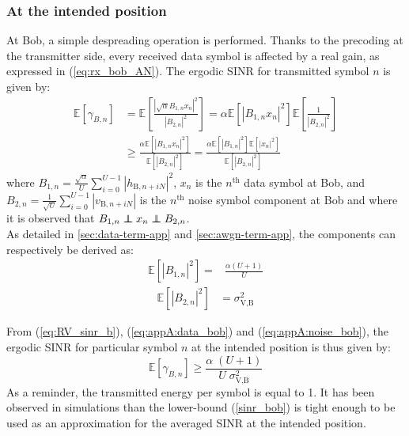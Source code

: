 \documentclass[journal,comsoc]{IEEEtran}
\newcommand{\EX}[1]{\mathbb{E} \left[#1\right]}%
\newcommand\independent{\protect\mathpalette{\protect\independenT}{\perp}}
\def\independenT#1#2{\mathrel{\rlap{$#1#2$}\mkern2mu{#1#2}}}
\begin{document}
\subsubsection{At the intended position}
At Bob, a simple despreading operation is performed. Thanks to the precoding at the transmitter side, every received data symbol is affected by a real gain, as expressed in (\ref{eq:rx_bob_AN}). The ergodic SINR for transmitted symbol $n$ is given by:
\begin{equation}
\begin{split}
\EX{\gamma_{B,n}} &= \EX{ \frac{  \left| \sqrt{\alpha} B_{1,n} x_n \right|^2  }{  \left| B_{2,n} \right|^2} }  = \alpha \EX{\left| B_{1,n}  x_n\right|^2}  \EX{\frac{1}{\left| B_{2,n} \right|^2}}  \\
& \geq  \frac{\alpha \EX{  \left| B_{1,n}  x_n\right|^2 } }{\EX{ \left| B_{2,n} \right|^2 }} =  \frac{\alpha \EX{ \left|B_{1,n}  \right|^2 } \EX{ \left| x_n \right|^2 } }{\EX{ \left| B_{2,n} \right|^2 }}
\label{eq:RV_sinr_b}
\end{split}
\end{equation}
where $B_{1,n} = \frac{\sqrt{\alpha}}{U}\sum_{i=0}^{U-1} \left| h_{\text{B}, n + iN}\right|^2$, $x_n$ is the $n^{\text{th}}$ data symbol at Bob, and $B_{2,n} = \frac{1}{\sqrt{U}}\sum_{i=0}^{U-1} \left| v_{\text{B}, n + iN}\right|$ is the $n^{\text{th}}$ noise symbol component at Bob and where it is observed that $B_{1,n} \independent x_n \independent B_{2,n}$.\\
As detailed in \ref{sec:data-term-app} and \ref{sec:awgn-term-app}, the components can respectively be derived as:
\begin{equation}
	\begin{split}
	\EX{|B_{1,n}|^2} =& \frac{\alpha (U+1)}{U}
	\end{split}
	\label{eq:appA:data_bob}
\end{equation}
\begin{equation}
	\begin{split}
	\EX{|B_{2,n}|^2} &= \sigma^2_{\text{V,B}}
	\end{split}
	\label{eq:appA:noise_bob}
\end{equation}

From (\ref{eq:RV_sinr_b}), (\ref{eq:appA:data_bob}) and (\ref{eq:appA:noise_bob}), the ergodic SINR for particular symbol $n$ at the intended position is thus given by:
\begin{equation}
\EX{\gamma_{B,n}} \geq \frac{\alpha \;(U+1)}{U \; \sigma_{\text{V,B}}^2}
\label{sinr_bob}
\end{equation}
As a reminder, the transmitted energy per symbol is equal to 1. It has been observed in simulations than the lower-bound (\ref{sinr_bob}) is tight enough to be used as an approximation for the averaged SINR at the intended position. 
\end{document}
